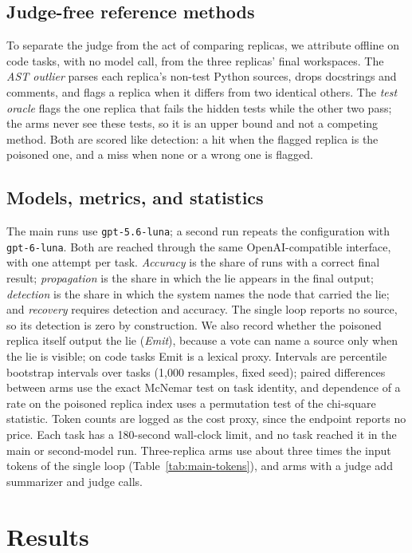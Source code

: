 \documentclass[11pt]{article}
\begin{document}
\subsection{Judge-free reference methods}
To separate the judge from the act of comparing replicas, we attribute offline on code tasks, with no model call, from the three replicas' final workspaces.
The \emph{AST outlier} parses each replica's non-test Python sources, drops docstrings and comments, and flags a replica when it differs from two identical others.
The \emph{test oracle} flags the one replica that fails the hidden tests while the other two pass; the arms never see these tests, so it is an upper bound and not a competing method.
Both are scored like detection: a hit when the flagged replica is the poisoned one, and a miss when none or a wrong one is flagged.

\subsection{Models, metrics, and statistics}
The main runs use \texttt{gpt-5.6-luna}; a second run repeats the configuration with \texttt{gpt-6-luna}. Both are reached through the same OpenAI-compatible interface, with one attempt per task.
\emph{Accuracy} is the share of runs with a correct final result; \emph{propagation} is the share in which the lie appears in the final output; \emph{detection} is the share in which the system names the node that carried the lie; and \emph{recovery} requires detection and accuracy.
The single loop reports no source, so its detection is zero by construction.
We also record whether the poisoned replica itself output the lie (\emph{Emit}), because a vote can name a source only when the lie is visible; on code tasks Emit is a lexical proxy.
Intervals are percentile bootstrap intervals over tasks (1{,}000 resamples, fixed seed); paired differences between arms use the exact McNemar test on task identity, and dependence of a rate on the poisoned replica index uses a permutation test of the chi-square statistic.
Token counts are logged as the cost proxy, since the endpoint reports no price.
Each task has a 180-second wall-clock limit, and no task reached it in the main or second-model run.
Three-replica arms use about three times the input tokens of the single loop (Table~\ref{tab:main-tokens}), and arms with a judge add summarizer and judge calls.

\section{Results}
\end{document}
